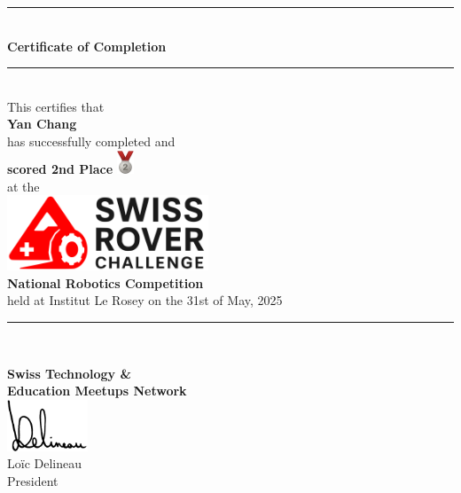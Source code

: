 \documentclass[10pt]{article}
\begin{document}
\begin{center}
	\rule{10cm}{0.4pt} \\
	\vspace{1cm}
	{\LARGE \bfseries Certificate of Completion} \\
	\vspace{0.5cm}
	\rule{10cm}{0.4pt} \\
	\vspace{1.5cm}
	{\large This certifies that} \\
	\vspace{1cm}
	{\Huge \bfseries Yan Chang} \\
	\vspace{1cm}
	{\large has successfully completed and} \\
	\vspace{0.8cm}
	{\LARGE \bfseries scored 2nd Place}
	\includegraphics[width=0.5cm]{silver.png} \\
	\vspace{1cm}
	{\large at the} \\
	\vspace{1cm}
	\includegraphics[width=6cm]{src.png} \\
	\vspace{1cm}
	{\LARGE \bfseries National Robotics Competition} \\
	\vspace{1cm}
	{\large held at Institut Le Rosey on the 31st of May, 2025} \\
	\vspace{1cm}
	\rule{10cm}{0.4pt} \\
\end{center}

\begin{flushright}
\end{flushright}

\vfill

\begin{center}
	\textbf{Swiss Technology \&} \\
	\textbf{Education Meetups Network} \\
	\vspace{0.3cm}
	\includegraphics[width=2.4cm]{signature-tight.png} \\
	Loïc Delineau \\
	President \\
\end{center}
\end{document}
